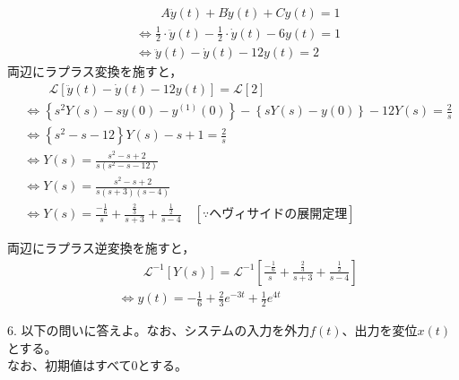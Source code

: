 \documentclass[a4paper,12pt]{article}
\begin{document}
\begin{tcolorbox}[title={5. あるシステムの微分方程式が\( A \ddot{y}(t) + B \dot{y}(t) + C y(t) = 1\)で表現できるとき、各パラメータを\(A=0.5,B=-0.5,C=-6,\)初期条件を\(y(0)=1,\dot{y}(0)=0\)として、\(y(t)\)
    を求めよ。 }]
    \begin{align*}
        &\qquad A \ddot{y}(t) + B \dot{y}(t) + C y(t) = 1 \\
        &\Leftrightarrow \frac{1}{2} \cdot \ddot{y}(t) - \frac{1}{2} \cdot  \dot{y}(t) - 6 y(t) = 1 \\
        &\Leftrightarrow \ddot{y}(t) - \dot{y}(t) - 12 y(t) = 2
    \end{align*}
    \quad 両辺にラプラス変換を施すと，
    \vspace{-3mm}
    \begin{align*}
        &\qquad \mathcal{L}\left[ \ddot{y}(t) - \dot{y}(t) - 12 y(t) \right] 
        = \mathcal{L} \left[ 2 \right] \\
        &\Leftrightarrow \left\{ s^2 Y(s) - sy(0) - y^{(1)}(0) \right\}
        - \left\{ sY(s) - y(0) \right\}
        - 12 Y(s) = \frac{2}{s}  \\
        &\Leftrightarrow \left\{ s^2 - s - 12 \right\} Y(s) - s + 1= \frac{2}{s}  \\
        &\Leftrightarrow Y(s) = \frac{s^2 - s + 2}{s(s^2 - s - 12)}  \\
        &\Leftrightarrow Y(s) =  \frac{s^2 - s + 2}{ s (s + 3)(s - 4) }  \\
        &\Leftrightarrow Y(s) =  \frac{- \frac{1}{6}}{ s } + \frac{  \frac{2}{3} }{ s + 3 } + \frac{  \frac{1}{2} }{ s - 4 } 
        \quad \left[\because ヘヴィサイドの展開定理 \right]
    \end{align*}
        
    \quad 両辺にラプラス逆変換を施すと，
    \vspace{-3mm}
    \begin{align*}
    &\qquad \mathcal{L}^{-1} \left[ Y(s) \right] 
    = \mathcal{L}^{-1} \left[ \frac{- \frac{1}{6}}{ s } + \frac{  \frac{2}{3} }{ s + 3 } + \frac{  \frac{1}{2} }{ s - 4 }  \right] \\
    &\Leftrightarrow y(t) = - \frac{1}{6} + \frac{2}{3}e^{-3t} + \frac{1}{2}e^{4t}
    \end{align*}
\end{tcolorbox}
6. 以下の問いに答えよ。なお、システムの入力を外力\(f(t)\)、出力を変位\(x(t)\)とする。\\
    なお、初期値はすべて\(0\)とする。\\
\end{document}
